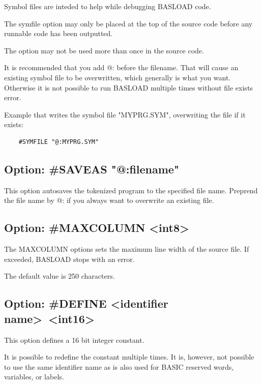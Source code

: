 \documentclass{article}
\begin{document}
        Symbol files are inteded to help while debugging BASLOAD code.
    
        The symfile option may only be placed at the top of
        the source code before any runnable code has
        been outputted.

        The option may not be used more than once in the source code.

        It is recommended that you add @: before the filename. That will cause
        an existing symbol file to be overwritten, which generally is what you
        want. Otherwise it is not possible to run BASLOAD multiple times
        without file exists error.

        Example that writes the symbol file "MYPRG.SYM", overwriting the
        file if it exists:
        \begin{verbatim}
    #SYMFILE "@:MYPRG.SYM"
        \end{verbatim}

    \subsection{Option: \#SAVEAS "@:filename"}
        
        This option autosaves the tokenized program to the
        specified file name. Preprend the file name by
        @: if you always want to overwrite an existing file.

    \subsection{Option: \#MAXCOLUMN \textless int8\textgreater}
    
        The MAXCOLUMN options sets the maximum line width
        of the source file. If exceeded, BASLOAD stops with an
        error.

        The default value is 250 characters.

    \subsection{Option: \#DEFINE \textless identifier name\textgreater \  \textless int16\textgreater }
    
        This option defines a 16 bit integer constant.
        
        It is possible to redefine the constant multiple times.
        It is, however, not possible to use the same identifier name as is also
        used for BASIC reserved words, variables, or labels.
\end{document}
